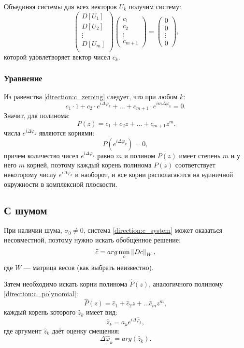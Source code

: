 Объединяя системы для всех векторов $U_k$ получим систему:
\begin{equation}~\label{direction:c_system}
    \begin{pmatrix}
        D[U_1] \\
        D[U_2] \\
        \vdots \\
        D[U_m] \\
    \end{pmatrix}
    \begin{pmatrix}
        c_1    \\
        c_2    \\
        \vdots \\
        c_{m+1}
    \end{pmatrix}
    =
    \begin{pmatrix}
        0      \\
        0      \\
        \vdots \\
        0
    \end{pmatrix} ,
\end{equation}
которой удовлетворяет вектор чисел $c_k$.

\subsubsection{Уравнение}

Из равенства \eqref{direction:c_zeroing} следует, что при любом $k$:
\[
    c_1 \cdot 1 + c_2 \cdot e^{i \Delta \varphi_k} + \dots + c_{m+1} \cdot e^{i m \Delta \varphi_k} = 0 .
\]
Значит, для полинома:
\begin{equation}~\label{direction:c_polynomial}
    P(z) = c_1 + c_2 z + \dots + c_{m+1} z^m .
\end{equation}
числа $e^{i \Delta \varphi_k}$ являются корнями:
\[
    P \left( e^{i \Delta \varphi_k} \right) = 0 ,
\]
причем количество чисел $e^{i \Delta \varphi_k}$ равно $m$ и полином $P(z)$ имеет степень $m$ и у него $m$ корней, поэтому каждый корень полинома $P(z)$
соответствует некоторому числу $e^{i \Delta \varphi_k}$ и наоборот, и все корни располагаются на единичной окружности в комплексной плоскости.

\subsection{С шумом}

При наличии шума, $\sigma_0 \neq 0$, система \eqref{direction:c_system} может оказаться несовместной, поэтому нужно искать обобщённое решение:
\[
    \widehat{c} = arg \min_c \left \| D c \right \|_{W} ,
\]
где $W$ --- матрица весов (как выбрать неизвестно).

Затем необходимо искать корни полинома $\widehat{P}(z)$, аналогичного полиному \eqref{direction:c_polynomial}:
\[
    \widehat{P}(z)
    = \widehat{c}_1 + \widehat{c}_2 z + \dots \widehat{c}_m z^m ,
\]
каждый корень которого $\widehat{z}_k$ имеет вид:
\[
    \widehat{z}_k
    = a_k e^{i \Delta \widehat{\varphi}_k} ,
\]
где аргумент $\widehat{z}_k$ даёт оценку смещения:
\[
    \Delta \widehat{\varphi}_k
    = arg \left( \widehat{z}_k \right).
\]